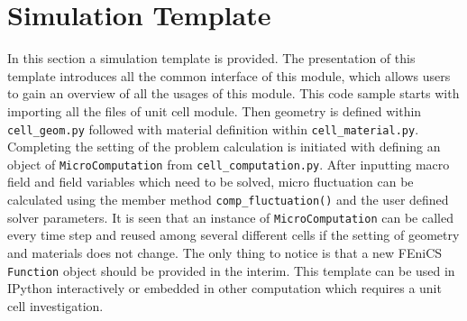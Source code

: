 \documentclass[10pt,a4paper]{scrreprt}
\begin{document}
\section{Simulation Template}
In this section a simulation template is provided. The presentation of this template introduces all the common interface of this module, which allows users to gain an overview of all the usages of this module. This code sample starts with importing all the files of unit cell module. Then geometry is defined within \texttt{cell\_geom.py} followed with material definition within \texttt{cell\_material.py}. Completing the setting of the problem calculation is initiated with defining an object of \texttt{MicroComputation} from \texttt{cell\_computation.py}. After inputting macro field and field variables which need to be solved, micro fluctuation can be calculated using the member method \texttt{comp\_fluctuation()} and the user defined solver parameters. It is seen that an instance of \texttt{MicroComputation} can be called every time step and reused among several different cells if the setting of geometry and materials does not change. The only thing to notice is that a new FEniCS \texttt{Function} object should be provided in the interim. This template can be used in IPython interactively or embedded in other computation which requires a unit cell investigation.
\end{document}
